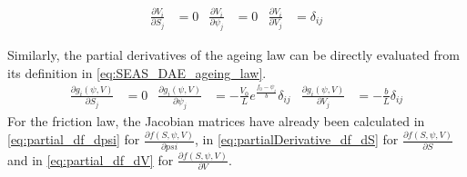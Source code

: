 \begin{align}	
	\frac{\partial V_i}{\partial S_j} &= 0 & \frac{\partial V_i}{\partial \psi_j} &= 0 & \frac{\partial V_i}{\partial V_j} &= \delta_{ij}
\end{align}

Similarly, the partial derivatives of the ageing law can be directly evaluated from its definition in \autoref{eq:SEAS_DAE_ageing_law}.
\begin{align}
	\frac{\partial g_i(\psi,V)}{\partial S_j} &=  0 &
	\frac{\partial g_i(\psi,V)}{\partial\psi_j} &= -\frac{V_0}{L}e^{\frac{f_0-\psi_i}{b}}\delta_{ij} &	
	\frac{\partial g_i(\psi,V)}{\partial V_j} &= -\frac{b}{L} \delta_{ij}
\end{align}
For the friction law, the Jacobian matrices have already been calculated in \autoref{eq:partial_df_dpsi} for $\frac{\partial f(S,\psi,V)}{\partial psi}$, in \autoref{eq:partialDerivative_df_dS} for $\frac{\partial f(S,\psi,V)}{\partial S}$ and in \autoref{eq:partial_df_dV} for $\frac{\partial f(S,\psi,V)}{\partial V}$.

